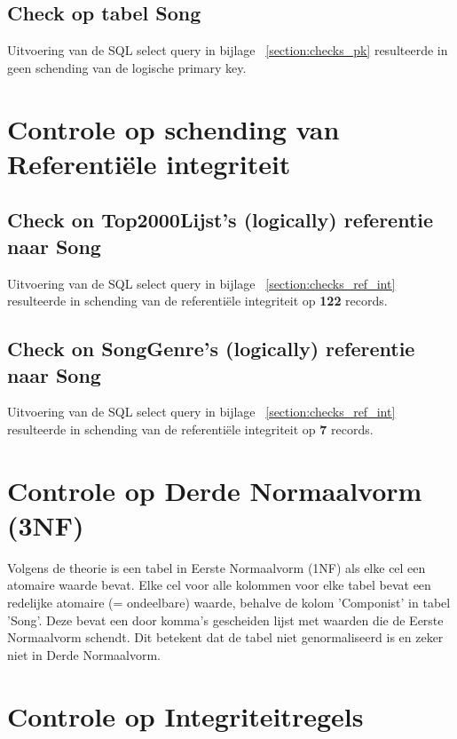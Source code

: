 \documentclass{report}
\begin{document}
            \subsection{Check op tabel Song}
                Uitvoering van de SQL select query in bijlage ~\ref{section:checks_pk} 
                resulteerde in geen schending van de logische primary key.

        \section{Controle op schending van Referentiële integriteit}

            \subsection{Check on Top2000Lijst's (logically) referentie naar Song}
                Uitvoering van de SQL select query in bijlage ~\ref{section:checks_ref_int} 
                resulteerde in schending van de referentiële integriteit op \textbf{122} records.

            \subsection{Check on SongGenre's (logically) referentie naar Song}
                Uitvoering van de SQL select query in bijlage ~\ref{section:checks_ref_int} 
                resulteerde in schending van de referentiële integriteit op \textbf{7} records.

        \section{Controle op Derde Normaalvorm (3NF)}

            Volgens de theorie is een tabel in Eerste Normaalvorm (1NF) als elke cel een atomaire waarde bevat. 
            Elke cel voor alle kolommen voor elke tabel bevat een redelijke atomaire (= ondeelbare) waarde, 
            behalve de kolom 'Componist' in tabel 'Song'. 
            Deze bevat een door komma's gescheiden lijst met waarden die de Eerste Normaalvorm schendt. 
            Dit betekent dat de tabel niet genormaliseerd is en zeker niet in Derde Normaalvorm.

        \section{Controle op Integriteitregels}
\end{document}
